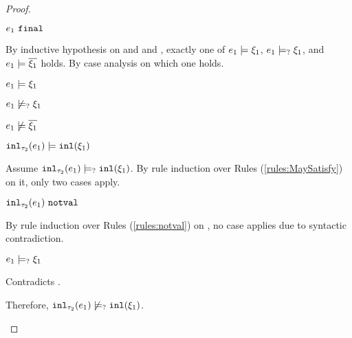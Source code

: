 \begin{proof}
\begin{byCases}
\begin{byCases}
\begin{pfsteps*}
        \item $e_1 ~\mathtt{final}$  
        \end{pfsteps*}
        By inductive hypothesis on  and  and , exactly one of $e_1 \models \xi_1$, $e_1 \models_{?} \xi_1$, and $e_1 \models \overline{\xi_1}$ holds. By case analysis on which one holds.
        \begin{byCases}
        \item[\csatisfy{e_1}{\xi_1}]
            \begin{pfsteps*}
            \item $e_1 \models \xi_1$  
            \item $e_1 \not\models_{?} \xi_1$  
            \item $e_1 \not\models \overline{\xi_1}$  
            \item $\mathtt{inl}_{\tau_2}({e_1}) \models \mathtt{inl}(\xi_1)$ 
            \end{pfsteps*}
            Assume $\mathtt{inl}_{\tau_2}({e_1}) \models_{?} \mathtt{inl}(\xi_1)$. By rule induction over Rules (\ref{rules:MaySatisfy}) on it, only two cases apply.
            \begin{byCases}
            \item[\text{(\ref{rule:CMSNotVal})}]
                \begin{pfsteps*}
                \item $\mathtt{inl}_{\tau_2}({e_1}) ~\mathtt{notval}$  
                \end{pfsteps*}
                By rule induction over Rules (\ref{rules:notval}) on , no case applies due to syntactic contradiction.
            \item[\text{(\ref{rule:CMSInl})}]
                \begin{pfsteps*}
                \item $e_1 \models_{?} \xi_1$
                \end{pfsteps*}
                Contradicts .
            \end{byCases}
            Therefore, $\mathtt{inl}_{\tau_2}({e_1}) \not\models_{?} \mathtt{inl}(\xi_1)$.\\

\end{byCases}
\end{byCases}
\end{byCases}
\end{proof}
